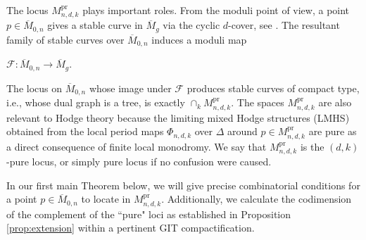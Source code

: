\documentclass[12pt, letterpaper]{amsart}
\theoremstyle{plain}
\theoremstyle{definition}
\begin{document}
The locus $M_{n,d,k}^{\mathrm{pr}}$ plays important roles. From the moduli point of view, a point $p\in \overline{M}_{0,n}$ gives a stable curve in $\overline{M}_{g}$ via the cyclic $d$-cover, see \cite{fedorchuk2011cyclic}. The resultant family of stable curves over $\overline{M}_{0,n}$ induces a moduli map
\begin{center}
    $\mathcal{F} : \overline{M}_{0,n}\rightarrow \overline{M}_{g}$.
\end{center}
The locus on $\overline{M}_{0,n}$ whose image under $\mathcal{F}$ produces stable curves of compact type, i.e., whose dual graph is a tree, is exactly $\cap_k M_{n,d,k}^{\mathrm{pr}}$. The spaces $M_{n,d,k}^{\mathrm{pr}}$ are also relevant to Hodge theory because the limiting mixed Hodge structures (LMHS) obtained from the local period maps $\Phi_{n,d,k}$ over $\Delta$ around $p \in M_{n,d,k}^{\mathrm{pr}}$ are pure as a direct consequence of finite local monodromy. 
We say that
$M_{n,d,k}^{\mathrm{pr}}$ is the $(d,k)$-pure locus, or simply pure locus if no confusion were caused.

In our first main Theorem below, we will give precise combinatorial conditions for a point $p\in \overline{M}_{0,n}$ to locate in $M_{n,d,k}^{\mathrm{pr}}$.  
Additionally, we calculate the codimension of the complement of the ``pure" loci as established in Proposition  \ref{prop:extension} within a pertinent GIT compactification.
\end{document}
